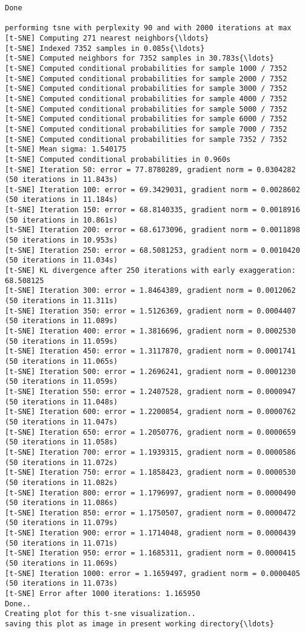 \documentclass[11pt]{article}
\begin{document}
    \begin{Verbatim}[commandchars=\\\{\}]
Done

performing tsne with perplexity 90 and with 2000 iterations at max
[t-SNE] Computing 271 nearest neighbors{\ldots}
[t-SNE] Indexed 7352 samples in 0.085s{\ldots}
[t-SNE] Computed neighbors for 7352 samples in 30.783s{\ldots}
[t-SNE] Computed conditional probabilities for sample 1000 / 7352
[t-SNE] Computed conditional probabilities for sample 2000 / 7352
[t-SNE] Computed conditional probabilities for sample 3000 / 7352
[t-SNE] Computed conditional probabilities for sample 4000 / 7352
[t-SNE] Computed conditional probabilities for sample 5000 / 7352
[t-SNE] Computed conditional probabilities for sample 6000 / 7352
[t-SNE] Computed conditional probabilities for sample 7000 / 7352
[t-SNE] Computed conditional probabilities for sample 7352 / 7352
[t-SNE] Mean sigma: 1.540175
[t-SNE] Computed conditional probabilities in 0.960s
[t-SNE] Iteration 50: error = 77.8780289, gradient norm = 0.0304282 (50 iterations in 11.843s)
[t-SNE] Iteration 100: error = 69.3429031, gradient norm = 0.0028602 (50 iterations in 11.184s)
[t-SNE] Iteration 150: error = 68.8140335, gradient norm = 0.0018916 (50 iterations in 10.861s)
[t-SNE] Iteration 200: error = 68.6173096, gradient norm = 0.0011898 (50 iterations in 10.953s)
[t-SNE] Iteration 250: error = 68.5081253, gradient norm = 0.0010420 (50 iterations in 11.034s)
[t-SNE] KL divergence after 250 iterations with early exaggeration: 68.508125
[t-SNE] Iteration 300: error = 1.8464389, gradient norm = 0.0012062 (50 iterations in 11.311s)
[t-SNE] Iteration 350: error = 1.5126369, gradient norm = 0.0004407 (50 iterations in 11.089s)
[t-SNE] Iteration 400: error = 1.3816696, gradient norm = 0.0002530 (50 iterations in 11.059s)
[t-SNE] Iteration 450: error = 1.3117870, gradient norm = 0.0001741 (50 iterations in 11.065s)
[t-SNE] Iteration 500: error = 1.2696241, gradient norm = 0.0001230 (50 iterations in 11.059s)
[t-SNE] Iteration 550: error = 1.2407528, gradient norm = 0.0000947 (50 iterations in 11.048s)
[t-SNE] Iteration 600: error = 1.2200854, gradient norm = 0.0000762 (50 iterations in 11.047s)
[t-SNE] Iteration 650: error = 1.2050776, gradient norm = 0.0000659 (50 iterations in 11.058s)
[t-SNE] Iteration 700: error = 1.1939315, gradient norm = 0.0000586 (50 iterations in 11.072s)
[t-SNE] Iteration 750: error = 1.1858423, gradient norm = 0.0000530 (50 iterations in 11.082s)
[t-SNE] Iteration 800: error = 1.1796997, gradient norm = 0.0000490 (50 iterations in 11.086s)
[t-SNE] Iteration 850: error = 1.1750507, gradient norm = 0.0000472 (50 iterations in 11.079s)
[t-SNE] Iteration 900: error = 1.1714048, gradient norm = 0.0000439 (50 iterations in 11.071s)
[t-SNE] Iteration 950: error = 1.1685311, gradient norm = 0.0000415 (50 iterations in 11.069s)
[t-SNE] Iteration 1000: error = 1.1659497, gradient norm = 0.0000405 (50 iterations in 11.073s)
[t-SNE] Error after 1000 iterations: 1.165950
Done..
Creating plot for this t-sne visualization..
saving this plot as image in present working directory{\ldots}

    \end{Verbatim}
\end{document}
